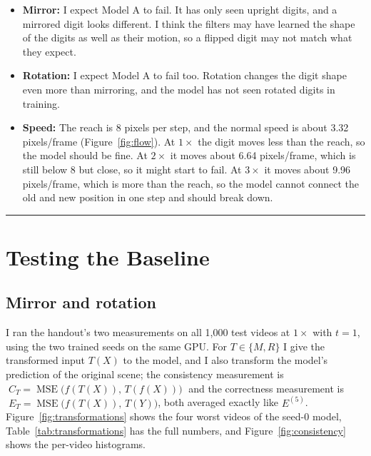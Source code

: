 \documentclass[11pt,letterpaper]{article}
\begin{document}
\begin{itemize}
  \item \textbf{Mirror:} I expect Model A to fail. It has only seen upright digits, and a mirrored
        digit looks different. I think the filters may have learned the shape of the digits as well
        as their motion, so a flipped digit may not match what they expect.
  \item \textbf{Rotation:} I expect Model A to fail too. Rotation changes the digit shape even more
        than mirroring, and the model has not seen rotated digits in training.
  \item \textbf{Speed:} The reach is 8 pixels per step, and the normal speed is about 3.32
        pixels/frame (Figure~\ref{fig:flow}). At $1\times$ the digit moves less than the reach, so
        the model should be fine. At $2\times$ it moves about 6.64 pixels/frame, which is still
        below 8 but close, so it might start to fail. At $3\times$ it moves about 9.96 pixels/frame,
        which is more than the reach, so the model cannot connect the old and new position in one
        step and should break down.
\end{itemize}

\vspace{10pt}
\hrule
\vspace{4pt}

\section*{Testing the Baseline}

\subsection*{Mirror and rotation}

I ran the handout's two measurements on all 1,000 test videos at $1\times$ with $t=1$, using the
two trained seeds on the same GPU. For $T \in \{M, R\}$ I give the transformed input $T(X)$ to the
model, and I also transform the model's prediction of the original scene; the consistency
measurement is
$\;C_T = \operatorname{MSE}\!\big(f(T(X)),\, T(f(X))\big)\;$ and the correctness measurement is
$\;E_T = \operatorname{MSE}\!\big(f(T(X)),\, T(Y)\big)$, both averaged exactly like $E^{(5)}$.
Figure~\ref{fig:transformations} shows the four worst videos of the seed-0 model,
Table~\ref{tab:transformations} has the full numbers, and Figure~\ref{fig:consistency} shows the
per-video histograms.
\end{document}
